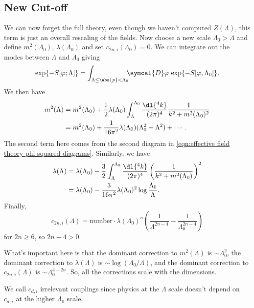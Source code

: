 \documentclass[fleqn]{NotesClass}
\newcommand{\DL}[1]{\symcal{D}#1}
\begin{document}
    \subsection{New Cut-off}
    We can now forget the full theory, even though we haven't computed \(Z(\Lambda)\), this term is just an overall rescaling of the fields.
    Now choose a new scale \(\Lambda_0 > \Lambda\) and define \(m^2(\Lambda_0)\), \(\lambda(\Lambda_0)\) and set \(c_{2n, i} (\Lambda_0) = 0\).
    We can integrate out the modes between \(\Lambda\) and \(\Lambda_0\) giving
    \begin{equation}
        \exp\{-S[\varphi; \Lambda]\} = \int_{\Lambda \le \abs{p} < \Lambda_0} \!\!\! \DL{\varphi} \, \exp\{ -S[\varphi, \Lambda_0] \}.
    \end{equation}
    We then have
    \begin{align}
        m^2(\Lambda) &= m^2(\Lambda_0) + \frac{1}{2}\lambda(\Lambda_0) \int_{\Lambda}^{\Lambda_0} \frac{\dl{^4k}}{(2\pi)^4} \frac{1}{k^2 + m^2(\Lambda_0)^2}\\
        &= m^2(\Lambda_0) + \frac{1}{16\pi^2} \lambda(\Lambda_0)(\Lambda_0^2 - \Lambda^2) + \dotsb.
    \end{align}
    The second term here comes from the second diagram in \cref{eqn:effective field theory phi squared diagrams}.
    Similarly, we have
    \begin{align}
        \lambda(\Lambda) &= \lambda(\Lambda_0) - \frac{3}{2} \int_{\Lambda}^{\Lambda_0} \frac{\dl{^4k}}{(2\pi)^4} \left( \frac{1}{k^2 + m^2(\Lambda_0)} \right)^2\\
        &= \lambda(\Lambda_0) - \frac{3}{16\pi^2} \lambda(\Lambda_0)^2 \log\frac{\Lambda_0}{\Lambda}.
    \end{align}
    Finally,
    \begin{equation}
        c_{2n,i}(\Lambda) = \text{number} \cdot \lambda(\Lambda_0)^n\left( \frac{1}{\Lambda^{2n - 4}} - \frac{1}{\Lambda_0^{2n - 4}} \right)
    \end{equation}
    for \(2n \ge 6\), so \(2n - 4 > 0\).
    
    What's important here is that the dominant correction to \(m^2(\Lambda)\) is \(\sim \Lambda_0^2\), the dominant correction to \(\lambda(\Lambda)\) is \(\sim\log(\Lambda_0/\Lambda)\), and the dominant correction to \(c_{2n,i}(\Lambda)\) is \(\sim \Lambda_0^{4 - 2n}\).
    So, all the corrections scale with the dimensions.
    
    We call \(c_{d,i}\) irrelevant couplings since physics at the \(\Lambda\) scale doesn't depend on \(c_{d,i}\) at the higher \(\Lambda_0\) scale.
    
\end{document}
